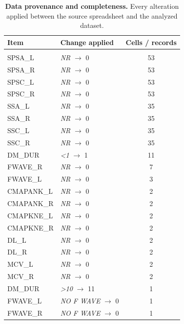 \documentclass[pdflatex,sn-mathphys-num]{sn-jnl}%
\theoremstyle{thmstyleone}%
\theoremstyle{thmstyletwo}%
\theoremstyle{thmstylethree}%
\begin{document}
\begin{appendices}
\begin{table}[!tbp]
    \centering
    \footnotesize
    \caption{\textbf{Data provenance and completeness.} Every alteration applied between
    the source spreadsheet and the analyzed dataset.}
    \label{tab:s1_provenance}
    \begin{tabular}{llc}
        \toprule
        \textbf{Item} & \textbf{Change applied} & \textbf{Cells / records} \\
        \midrule
        \addlinespace
        \multicolumn{3}{l}{\textit{Value recoding}} \\
        SPSA\_L & \textit{NR} $\rightarrow$ 0 & 53 \\
        SPSA\_R & \textit{NR} $\rightarrow$ 0 & 53 \\
        SPSC\_L & \textit{NR} $\rightarrow$ 0 & 53 \\
        SPSC\_R & \textit{NR} $\rightarrow$ 0 & 53 \\
        SSA\_L & \textit{NR} $\rightarrow$ 0 & 35 \\
        SSA\_R & \textit{NR} $\rightarrow$ 0 & 35 \\
        SSC\_L & \textit{NR} $\rightarrow$ 0 & 35 \\
        SSC\_R & \textit{NR} $\rightarrow$ 0 & 35 \\
        DM\_DUR & \textit{<1} $\rightarrow$ 1 & 11 \\
        FWAVE\_R & \textit{NR} $\rightarrow$ 0 & 7 \\
        FWAVE\_L & \textit{NR} $\rightarrow$ 0 & 3 \\
        CMAPANK\_L & \textit{NR} $\rightarrow$ 0 & 2 \\
        CMAPANK\_R & \textit{NR} $\rightarrow$ 0 & 2 \\
        CMAPKNE\_L & \textit{NR} $\rightarrow$ 0 & 2 \\
        CMAPKNE\_R & \textit{NR} $\rightarrow$ 0 & 2 \\
        DL\_L & \textit{NR} $\rightarrow$ 0 & 2 \\
        DL\_R & \textit{NR} $\rightarrow$ 0 & 2 \\
        MCV\_L & \textit{NR} $\rightarrow$ 0 & 2 \\
        MCV\_R & \textit{NR} $\rightarrow$ 0 & 2 \\
        DM\_DUR & \textit{>10} $\rightarrow$ 11 & 1 \\
        FWAVE\_L & \textit{NO F WAVE} $\rightarrow$ 0 & 1 \\
        FWAVE\_R & \textit{NO F WAVE} $\rightarrow$ 0 & 1 \\

\end{tabular}
\end{table}
\end{appendices}
\end{document}
